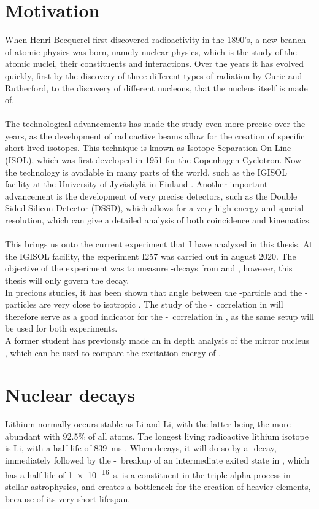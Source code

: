 \section{Motivation}
When Henri Becquerel first discovered radioactivity in the 1890's, a new branch of atomic physics was born, namely nuclear physics, which is the study of the atomic nuclei, their constituents and interactions. 
Over the years it has evolved quickly, first by the discovery of three different types of radiation by Curie and Rutherford, to the discovery of different nucleons, that the nucleus itself is made of. \\
\\
The technological advancements has made the study even more precise over the years, as the development of radioactive beams allow for the creation of specific short lived isotopes.
This technique is known as Isotope Separation On-Line (ISOL), which was first developed in 1951 for the Copenhagen Cyclotron. 
Now the technology is available in many parts of the world, such as the IGISOL facility at the University of Jyväskylä in Finland \cite{igisol}. 
Another important advancement is the development of very precise detectors, such as the Double Sided Silicon Detector (DSSD), which allows for a very high energy and spacial resolution, which can give a detailed analysis of both coincidence and kinematics. \\
\\
This brings us onto the current experiment that I have analyzed in this thesis. At the IGISOL facility, the experiment I257 was carried out in august 2020. The objective of the experiment was to measure \be-decays from \li and , however, this thesis will only govern the \li decay. \\
In precious studies, it has been shown that angle between the \be-particle and the \al-particles are very close to isotropic \cite{isotrop}. The study of the \be-\al\ correlation in \li will therefore serve as a good indicator for the \be-\al\ correlation in , as the same setup will be used for both experiments. \\
A former student has previously made an in depth analysis of the mirror nucleus , which can be used to compare the excitation energy of \ber \cite{andreas}. 


\section{Nuclear decays}
Lithium normally occurs stable as \isotope[6]Li and \isotope[7]Li, with the latter being the more abundant with 92.5\% of all atoms. The longest living radioactive lithium isotope is \isotope[8]Li, with a half-life of \SI{839}{ms} \cite{TILLEY2004155}. 
When \li decays, it will do so by a \be-decay, immediately followed by the \al-\al\ breakup of an intermediate exited state in \ber, which has a half life of \SI{1e-16}{s}. \ber is a constituent in the triple-alpha process in stellar astrophysics, and creates a bottleneck for the creation of heavier elements, because of its very short lifespan.

